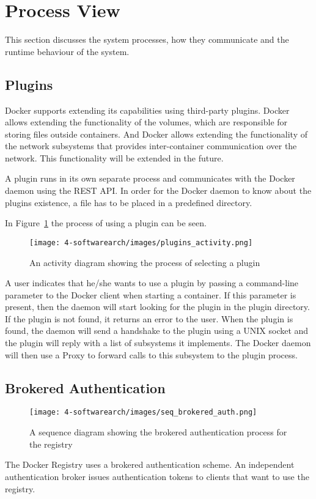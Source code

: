
\section{Process View}
\label{sec:viewprocess}
This section discusses the system processes, how they communicate and the runtime behaviour of the system.


	
\subsection{Plugins}
\label{sec:processplugins}
Docker supports extending its capabilities using third-party plugins. Docker allows extending the functionality of the volumes, which are responsible for storing files outside containers. And Docker allows extending the functionality of the network subsystems that provides inter-container communication over the network. This functionality will be extended in the future\cite{dockerplugindocs}.

A plugin runs in its own separate process and communicates with the Docker daemon using the REST API. In order for the Docker daemon to know about the plugins existence, a file has to be placed in a predefined directory. %

In Figure~\ref{fig:activity_plugin} the process of using a plugin can be seen.
\begin{figure}[H]
\caption{An activity diagram showing the process of selecting a plugin}
\centering
\texttt{[image: 4-softwarearch/images/plugins\_activity.png]}
\label{fig:activity_plugin}
\end{figure}

A user indicates that he/she wants to use a plugin by passing a command-line parameter to the Docker client when starting a container. If this parameter is present, then the daemon will start looking for the plugin in the plugin directory. If the plugin is not found, it returns an error to the user. 
When the plugin is found, the daemon will send a handshake to the plugin using a UNIX socket and the plugin will reply with a list of subsystems it implements. 
The Docker daemon will then use a Proxy to forward calls to this subsystem to the plugin process.

\subsection{Brokered Authentication}
\begin{figure}[H]
\caption{A sequence diagram showing the brokered authentication process for the registry}
\centering
\texttt{[image: 4-softwarearch/images/seq\_brokered\_auth.png]}
\label{fig:brokered_auth_seq}
\end{figure}
The Docker Registry uses a brokered authentication scheme. An independent authentication broker issues authentication tokens to clients that want to use the registry.

